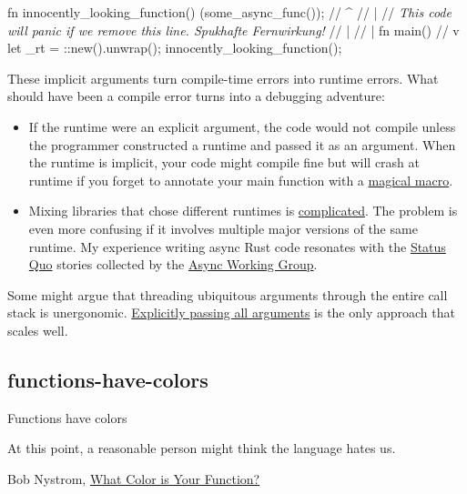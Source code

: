 \documentclass{article}
\begin{document}
\begin{code}[rust]
fn innocently_looking_function() {
  \href{https://docs.rs/tokio/1.25.0/tokio/fn.spawn.html}{}(some_async_func());
  // ^
  // |
  // \em{This code will panic if we remove this line. Spukhafte Fernwirkung!}
} //                                     |
  //                                     |
fn main() { //                           v
  let _rt = \href{https://docs.rs/tokio/1.25.0/tokio/runtime/struct.Runtime.html}{}::new().unwrap();
  innocently_looking_function();
}
\end{code}

These implicit arguments turn compile-time errors into runtime errors.
What should have been a compile error turns into a debugging adventure:

\begin{itemize}
  \item
    If the runtime were an explicit argument, the code would not compile unless the programmer constructed a runtime and passed it as an argument.
    When the runtime is implicit, your code might compile fine but will crash at runtime if you forget to annotate your main function with a \href{https://docs.rs/tokio/latest/tokio/attr.main.html}{magical macro}.
  \item
    Mixing libraries that chose different runtimes is \href{https://www.ncameron.org/blog/portable-and-interoperable-async-rust/}{complicated}.
    The problem is even more confusing if it involves multiple major versions of the same runtime.
    My experience writing async Rust code resonates with the \href{https://rust-lang.github.io/wg-async/vision/submitted_stories/status_quo.html}{Status Quo} stories collected by the \href{https://rust-lang.github.io/wg-async/welcome.html}{Async Working Group}.
\end{itemize}

Some might argue that threading ubiquitous arguments through the entire call stack is unergonomic.
\href{/posts/03-rust-packages-crates-modules.html#explicit-dependencies}{Explicitly passing all arguments} is the only approach that scales well.

\subsection{functions-have-colors}{Functions have colors}
\epigraph{
    At this point, a reasonable person might think the language hates us.
}{Bob Nystrom, \href{https://journal.stuffwithstuff.com/2015/02/01/what-color-is-your-function/}{What Color is Your Function?}}
\end{document}
